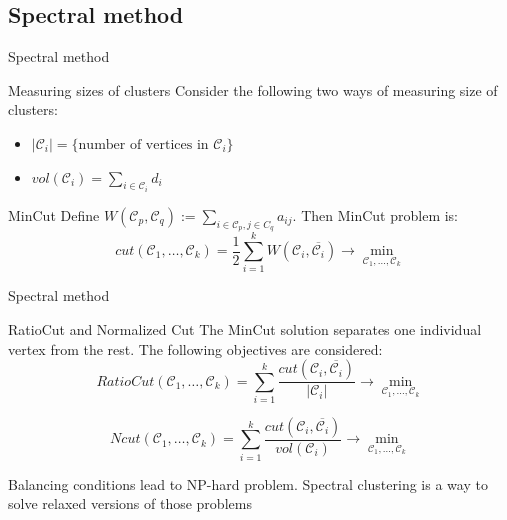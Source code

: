 \documentclass{beamer}
\theoremstyle{definition}
\theoremstyle{plain}
\theoremstyle{remark}
\begin{document}
		\subsection{Spectral method}
			\begin{frame}{Spectral method}
				\begin{block}{Measuring sizes of clusters}
					Consider the following two ways of measuring size of clusters:
					\begin{itemize}
						\item $|\mathcal{C}_{i}| = \{\text{number of vertices in $\mathcal{C}_{i}$}\}$
						\item $vol(\mathcal{C}_{i}) = \sum \limits_{i \in \mathcal{C}_{i}}d_{i}$
					\end{itemize}
				\end{block}
				\begin{block}{MinCut}
					Define $W(\mathcal{C}_p,\mathcal{C}_q):= \sum \limits_{i \in \mathcal{C}_p,j \in C_q}  a_{ij}.$ Then MinCut problem is:
\[
cut(\mathcal{C}_1,\dots,\mathcal{C}_k) = \frac{1}{2}\sum\limits_{i=1}^kW(\mathcal{C}_i,\overline{\mathcal{C}_i}) \rightarrow \min \limits_{\mathcal{C}_1,\dots,\mathcal{C}_k}
\]
				\end{block}
			\end{frame}		
		\begin{frame}{Spectral method}
				\begin{block}{RatioCut and Normalized Cut}
					The MinCut solution separates one individual vertex from the rest. The following objectives are considered:
\[
RatioCut(\mathcal{C}_1,\dots,\mathcal{C}_k) = \sum \limits_{i=1}^k \frac{cut(\mathcal{C}_i,\overline{\mathcal{C}_i})}{|\mathcal{C}_{i}|} \rightarrow \min \limits_{\mathcal{C}_1,\dots,\mathcal{C}_k}
\]

\[
Ncut(\mathcal{C}_1,\dots,\mathcal{C}_k)= \sum \limits_{i=1}^k \frac{cut(\mathcal{C}_i,\overline{\mathcal{C}_i})}{vol(\mathcal{C}_{i})} \rightarrow \min \limits_{\mathcal{C}_1,\dots,\mathcal{C}_k}
\]
			\end{block}
				Balancing conditions lead to NP-hard problem. Spectral clustering is a way to solve relaxed versions of those problems
			\end{frame}
\end{document}
